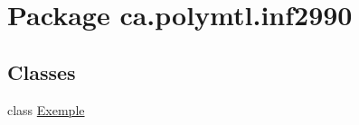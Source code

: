 \hypertarget{namespaceca_1_1polymtl_1_1inf2990}{\section{Package ca.\-polymtl.\-inf2990}
\label{namespaceca_1_1polymtl_1_1inf2990}
}
\subsection*{Classes}
\begin{DoxyCompactItemize}
\item 
class \hyperlink{classca_1_1polymtl_1_1inf2990_1_1_exemple}{Exemple}
\end{DoxyCompactItemize}
